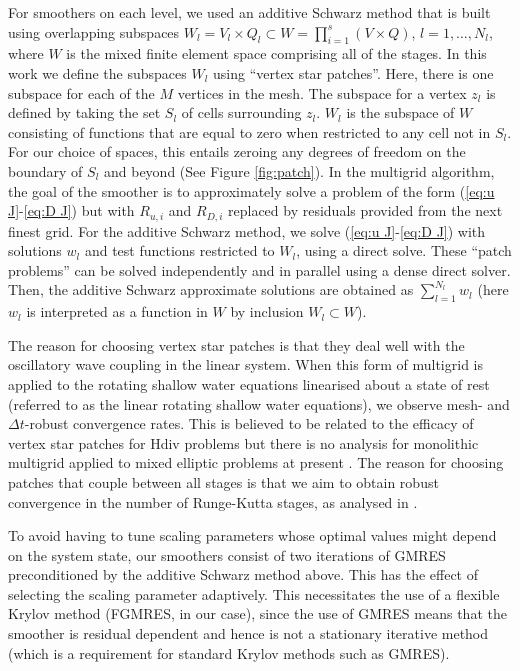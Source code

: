 \documentclass[a4paper, 12pt]{article}
\begin{document}
For smoothers on each level, we used an additive Schwarz method that
is built using overlapping subspaces $W_l=V_l\times Q_l \subset W =
\prod_{i=1}^s\left(V \times Q\right)$, $l=1,\ldots,N_l$, where $W$ is
the mixed finite element space comprising all of the stages.
In this work we define the subspaces $W_l$ using ``vertex
star patches''.  Here, there is one subspace for each of the $M$
vertices in the mesh.  The subspace for a vertex $z_l$ is defined by
taking the set $S_l$ of cells surrounding $z_l$. $W_l$ is the subspace
of $W$ consisting of functions that are equal to zero when restricted
to any cell not in $S_l$. For our choice of spaces, this entails
zeroing any degrees of freedom on the boundary of $S_l$ and beyond
(See Figure \ref{fig:patch}). In the multigrid algorithm, the goal of
the smoother is to approximately solve a problem of the form
(\ref{eq:u J}-\ref{eq:D J}) but with $R_{u,i}$ and $R_{D,i}$ replaced
by residuals provided from the next finest grid.  For the additive
Schwarz method, we solve (\ref{eq:u J}-\ref{eq:D J}) with solutions
$w_l$ and test functions restricted to $W_l$, using a direct
solve. These ``patch problems'' can be solved independently and in
parallel using a dense direct solver.  Then, the additive Schwarz
approximate solutions are obtained as $\sum_{l=1}^{N_l}w_l$ (here
$w_l$ is interpreted as a function in $W$ by inclusion $W_l\subset
W$).

The reason for choosing vertex star patches is that they deal well
with the oscillatory wave coupling in the linear system. When this
form of multigrid is applied to the rotating shallow water equations
linearised about a state of rest (referred to as the linear rotating
shallow water equations), we observe mesh- and $\Delta t$-robust
convergence rates. This is believed to be related to the efficacy of
vertex star patches for Hdiv problems \citep{arnold2000multigrid} but
there is no analysis for monolithic multigrid applied to mixed
elliptic problems at present \citep{sm}. The reason for choosing patches
that couple between all stages is that we aim to obtain robust
convergence in the number of Runge-Kutta stages, as analysed in
\citep{kirby2024convergence}.

To avoid having to tune scaling parameters whose optimal values might
depend on the system state, our smoothers consist of two iterations of
GMRES preconditioned by the additive Schwarz method above. This has
the effect of selecting the scaling parameter adaptively.  This
necessitates the use of a flexible Krylov method (FGMRES, in our
case), since the use of GMRES means that the smoother is residual
dependent and hence is not a stationary iterative method (which is a
requirement for standard Krylov methods such as GMRES).
\end{document}
